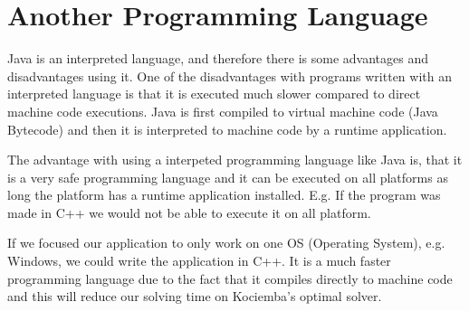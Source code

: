 \section{Another Programming Language}
Java is an interpreted language, and therefore there is some advantages and disadvantages using it. One of the disadvantages with programs written with an interpreted language is that it is executed much slower compared to direct machine code executions. Java is first compiled to virtual machine code (Java Bytecode) and then it is interpreted to machine code by a runtime application.

The advantage with using a interpeted programming language like Java is, that it is a very safe programming language and it can be executed on all platforms as long the platform has a runtime application installed. E.g. If the program was made in C++ we would not be able to execute it on all platform.

If we focused our application to only work on one OS (Operating System), e.g. Windows, we could write the application in C++. It is a much faster programming language due to the fact that it compiles directly to machine code and this will reduce our solving time on Kociemba's optimal solver.
